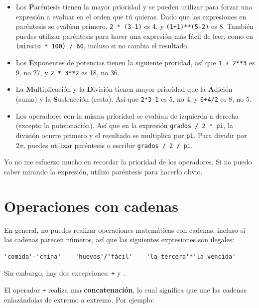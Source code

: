\documentclass[10pt]{book}
\begin{document}
\begin{itemize}

\item Los {\bf P}aréntesis tienen la mayor prioridad y se pueden utilizar 
para forzar una expresión a evaluar en el orden que tú quieras. Dado que
las expresiones en paréntesis se evalúan primero, {\tt 2 * (3-1)} es 4,
y {\tt (1+1)**(5-2)} es 8. También puedes utilizar paréntesis para hacer una
expresión más fácil de leer, como en {\tt (minuto * 100) / 60}, incluso
si no cambia el resultado.

\item Los {\bf E}xponentes de potencias tienen la siguiente proridad, así que
{\tt 1 + 2**3} es 9, no 27, y {\tt 2 * 3**2} es 18, no 36.

\item La {\bf M}ultiplicación y la {\bf D}ivisión tienen mayor prioridad
	que la {\bf A}dición (suma) y la {\bf S}ustracción (resta).  Así que {\tt 2*3-1} es 5, no
  4, y {\tt 6+4/2} es 8, no 5.

\item Los operadores con la misma prioridad se evalúan de izquierda a
  derecha (excepto la potenciación).  Así que en la expresión {\tt grados /
    2 * pi}, la división ocurre primero y el resultado se multiplica
  por {\tt pi}.  Para dividir por $2 \pi$, puedes utilizar paréntesis o escribir
  {\tt grados / 2 / pi}.

\end{itemize}

Yo no me esfuerzo mucho en recordar la prioridad de los
operadores. Si no puedo saber mirando la expresión, utilizo
paréntesis para hacerlo obvio.


\section{Operaciones con cadenas}

En general, no puedes realizar operaciones matemáticas con cadenas, incluso
si las cadenas parecen números, así que las siguientes expresiones son ilegales:

\begin{verbatim}
'comida'-'china'    'huevos'/'fácil'    'la tercera'*'la vencida'
\end{verbatim}
%
Sin embargo, hay dos excepciones: {\tt +} y {\tt *}.

El operador {\tt +} realiza una {\bf concatenación}, lo cual significa que
une las cadenas enlazándolas de extremo a extremo.  Por ejemplo:
\end{document}
